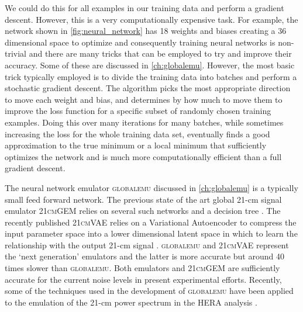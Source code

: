 We could do this for all examples in our training data and perform a gradient descent. However, this is a very computationally expensive task. For example, the network shown in \cref{fig:neural_network} has 18 weights and biases creating a 36 dimensional space to optimize and consequently training neural networks is non-trivial and there are many tricks that can be employed to try and improve their accuracy. Some of these are discussed in \cref{ch:globalemu}. However, the most basic trick typically employed is to divide the training data into batches and perform a stochastic gradient descent. The algorithm picks the most appropriate direction to move each weight and bias, and determines by how much to move them to improve the loss function for a specific subset of randomly chosen training examples. Doing this over many iterations for many batches, while sometimes increasing the loss for the whole training data set, eventually finds a good approximation to the true minimum or a local minimum that sufficiently optimizes the network and is much more computationally efficient than a full gradient descent. %

The neural network emulator \textsc{globalemu} discussed in \cref{ch:globalemu} is a typically small feed forward network. The previous state of the art global 21-cm signal emulator \textsc{21cmGEM} relies on several such networks and a decision tree \cite{Cohen2020}. The recently published \textsc{21cmVAE} relies on a Variational Autoencoder to compress the input parameter space into a lower dimensional latent space in which to learn the relationship with the output 21-cm signal \cite{21cmVAE}.  \textsc{globalemu} and \textsc{21cmVAE} represent the `next generation' emulators and the latter is more accurate but around 40 times slower than \textsc{globalemu}. Both emulators and \textsc{21cmGEM} are sufficiently accurate for the current noise levels in present experimental efforts. Recently, some of the techniques used in the development of \textsc{globalemu} have been applied to the emulation of the 21-cm power spectrum in the HERA analysis \cite{HERA_2022c}. %

